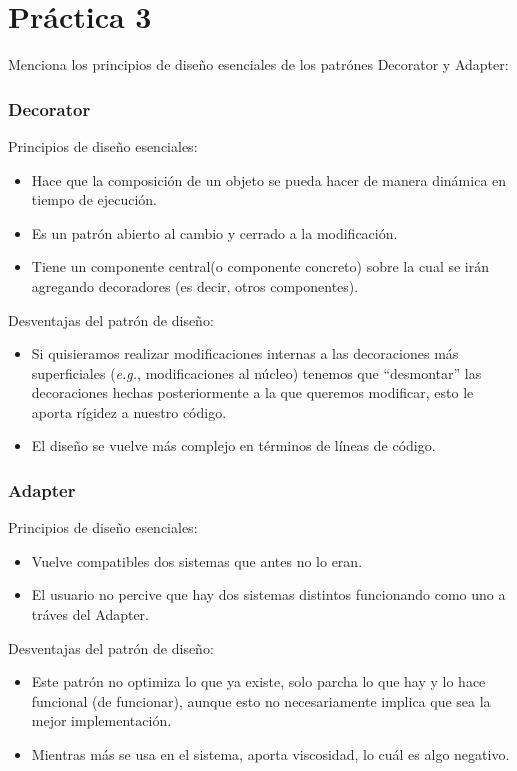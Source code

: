 \documentclass{article}
\begin{document}

\section*{\LARGE{Práctica 3}}
Menciona los principios de diseño esenciales de los patrónes Decorator y Adapter:

\subsubsection*{Decorator}

Principios de diseño esenciales:
\newcommand{\localtextbulletone}{\textcolor{black}{\raisebox{.45ex}{\rule{.6ex}{.6ex}}}}
\renewcommand{\labelitemi}{\localtextbulletone}
\begin{itemize}
\item Hace que la composición de un objeto se pueda hacer de manera dinámica en tiempo de ejecución.
\item Es un patrón abierto al cambio y cerrado a la modificación.
\item Tiene un componente central(o componente concreto) sobre la cual se irán agregando decoradores (es decir, otros componentes).
\end{itemize}

Desventajas del patrón de diseño:
\begin{itemize}
\item Si quisieramos realizar modificaciones internas a las decoraciones más superficiales
  (\textit{e.g.}, modificaciones al núcleo) tenemos que ``desmontar'' las decoraciones hechas
  posteriormente a la que queremos modificar, esto le aporta rígidez a nuestro código.
\item El diseño se vuelve más complejo en términos de líneas de código.
\end{itemize}

\subsubsection*{Adapter}

Principios de diseño esenciales:
\begin{itemize}
\item Vuelve compatibles dos sistemas que antes no lo eran.
\item El usuario no percive que hay dos sistemas distintos funcionando como uno a tráves del Adapter.
\end{itemize}

Desventajas del patrón de diseño:
\begin{itemize}
\item Este patrón no optimiza lo que ya existe, solo parcha lo que hay y lo hace funcional (de funcionar),
  aunque esto no necesariamente implica que sea la mejor implementación.
\item Mientras más se usa en el sistema, aporta viscosidad, lo cuál es algo negativo.
\end{itemize}
\end{document}
